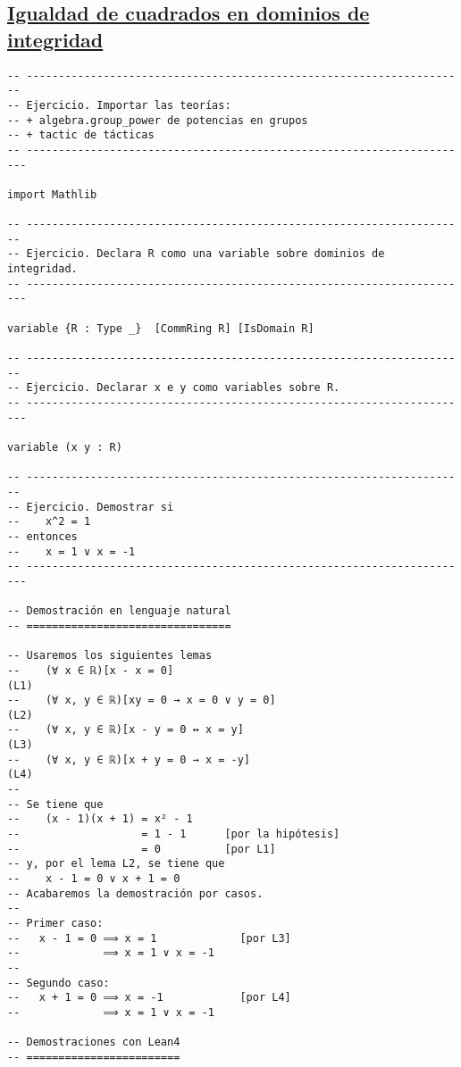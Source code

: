 \subsection{\href{./src/Logica/Igualdad\_de\_cuadrados\_en\_dominios\_de\_integridad.lean}{Igualdad de cuadrados en dominios de integridad}}
\label{sec:orgbdb1394}
\begin{verbatim}
-- ---------------------------------------------------------------------
-- Ejercicio. Importar las teorías:
-- + algebra.group_power de potencias en grupos
-- + tactic de tácticas
-- ----------------------------------------------------------------------

import Mathlib

-- ---------------------------------------------------------------------
-- Ejercicio. Declara R como una variable sobre dominios de integridad.
-- ----------------------------------------------------------------------

variable {R : Type _}  [CommRing R] [IsDomain R]

-- ---------------------------------------------------------------------
-- Ejercicio. Declarar x e y como variables sobre R.
-- ----------------------------------------------------------------------

variable (x y : R)

-- ---------------------------------------------------------------------
-- Ejercicio. Demostrar si
--    x^2 = 1
-- entonces
--    x = 1 ∨ x = -1
-- ----------------------------------------------------------------------

-- Demostración en lenguaje natural
-- ================================

-- Usaremos los siguientes lemas
--    (∀ x ∈ ℝ)[x - x = 0]                                           (L1)
--    (∀ x, y ∈ ℝ)[xy = 0 → x = 0 ∨ y = 0]                           (L2)
--    (∀ x, y ∈ ℝ)[x - y = 0 ↔ x = y]                                (L3)
--    (∀ x, y ∈ ℝ)[x + y = 0 → x = -y]                               (L4)
--
-- Se tiene que
--    (x - 1)(x + 1) = x² - 1
--                   = 1 - 1      [por la hipótesis]
--                   = 0          [por L1]
-- y, por el lema L2, se tiene que
--    x - 1 = 0 ∨ x + 1 = 0
-- Acabaremos la demostración por casos.
--
-- Primer caso:
--   x - 1 = 0 ⟹ x = 1             [por L3]
--             ⟹ x = 1 ∨ x = -1
--
-- Segundo caso:
--   x + 1 = 0 ⟹ x = -1            [por L4]
--             ⟹ x = 1 ∨ x = -1

-- Demostraciones con Lean4
-- ========================


\end{verbatim}
